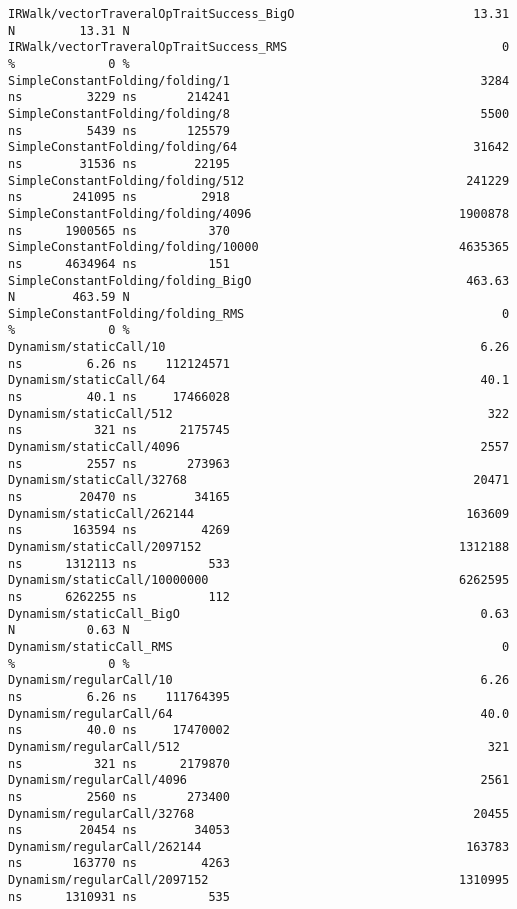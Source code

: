 \begin{code}
\begin{verbatim}
IRWalk/vectorTraveralOpTraitSuccess_BigO                         13.31 N         13.31 N
IRWalk/vectorTraveralOpTraitSuccess_RMS                              0 %             0 %
SimpleConstantFolding/folding/1                                   3284 ns         3229 ns       214241
SimpleConstantFolding/folding/8                                   5500 ns         5439 ns       125579
SimpleConstantFolding/folding/64                                 31642 ns        31536 ns        22195
SimpleConstantFolding/folding/512                               241229 ns       241095 ns         2918
SimpleConstantFolding/folding/4096                             1900878 ns      1900565 ns          370
SimpleConstantFolding/folding/10000                            4635365 ns      4634964 ns          151
SimpleConstantFolding/folding_BigO                              463.63 N        463.59 N
SimpleConstantFolding/folding_RMS                                    0 %             0 %
Dynamism/staticCall/10                                            6.26 ns         6.26 ns    112124571
Dynamism/staticCall/64                                            40.1 ns         40.1 ns     17466028
Dynamism/staticCall/512                                            322 ns          321 ns      2175745
Dynamism/staticCall/4096                                          2557 ns         2557 ns       273963
Dynamism/staticCall/32768                                        20471 ns        20470 ns        34165
Dynamism/staticCall/262144                                      163609 ns       163594 ns         4269
Dynamism/staticCall/2097152                                    1312188 ns      1312113 ns          533
Dynamism/staticCall/10000000                                   6262595 ns      6262255 ns          112
Dynamism/staticCall_BigO                                          0.63 N          0.63 N
Dynamism/staticCall_RMS                                              0 %             0 %
Dynamism/regularCall/10                                           6.26 ns         6.26 ns    111764395
Dynamism/regularCall/64                                           40.0 ns         40.0 ns     17470002
Dynamism/regularCall/512                                           321 ns          321 ns      2179870
Dynamism/regularCall/4096                                         2561 ns         2560 ns       273400
Dynamism/regularCall/32768                                       20455 ns        20454 ns        34053
Dynamism/regularCall/262144                                     163783 ns       163770 ns         4263
Dynamism/regularCall/2097152                                   1310995 ns      1310931 ns          535

\end{verbatim}
\end{code}
